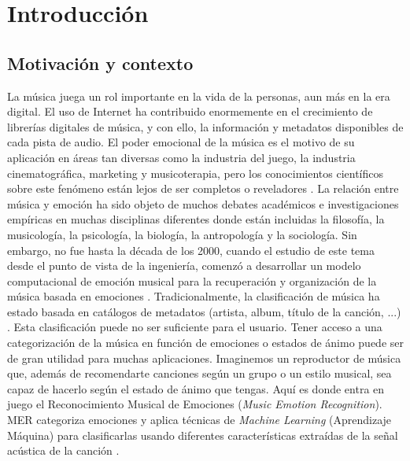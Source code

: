 \documentclass[12pt,a4paper,Spanish]{article}
\begin{document}
\newpage
\renewcommand{\listfigurename}{ÍNDICE DE FIGURAS} %
\listoffigures %






\newpage
\section{Introducción}
\subsection{Motivación y contexto}
La música juega un rol importante en la vida de la personas, aun más en la era digital. El uso de Internet ha contribuido enormemente en el crecimiento de librerías digitales de música, y con ello, la información y metadatos disponibles de cada pista de audio. El poder emocional de la música es el motivo de su aplicación en áreas tan diversas como la industria del juego, la industria cinematográfica, marketing y musicoterapia, pero los conocimientos científicos sobre este fenómeno están lejos de ser completos o reveladores \cite{eerola2012review}.
\newline
La relación entre música y emoción ha sido objeto de muchos debates académicos e investigaciones empíricas en muchas disciplinas diferentes donde están incluidas la filosofía, la musicología, la psicología, la biología, la antropología y la sociología. Sin embargo, no fue hasta la década de los 2000, cuando el estudio de este tema desde el punto de vista de la ingeniería, comenzó a desarrollar un modelo computacional de emoción musical para la recuperación y organización de la música basada en emociones \cite{yang2011music}.
\newline
Tradicionalmente, la clasificación de música ha estado basada en catálogos de metadatos (artista, album, título de la canción, ...) \cite{yang2011music}. Esta clasificación puede no ser suficiente para el usuario. Tener acceso a una categorización de la música en función de emociones o estados de ánimo puede ser de gran utilidad para muchas aplicaciones. Imaginemos un reproductor de música que, además de recomendarte canciones según un grupo o un estilo musical, sea capaz de hacerlo según el estado de ánimo que tengas.
\newline
Aquí es donde entra en juego el Reconocimiento Musical de Emociones (\textit{Music Emotion Recognition}). MER categoriza emociones y aplica técnicas de \textit{Machine Learning} (Aprendizaje Máquina) para clasificarlas usando diferentes características extraídas de la señal acústica de la canción \cite{yang2011music}.
\end{document}
